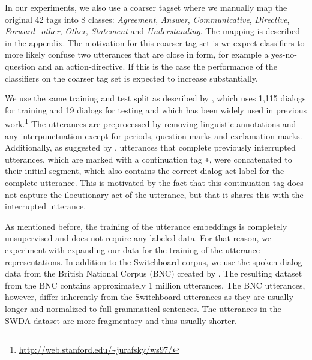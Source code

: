In our experiments, we also use a coarser tagset where we manually map the original 42 tags into 8 classes: \emph{Agreement}, \emph{Answer}, \emph{Communicative}, \emph{Directive}, \emph{Forward\_other}, \emph{Other},  \emph{Statement} and \emph{Understanding}.
The mapping is described in the appendix.
The motivation for this coarser tag set is we expect classifiers to more likely confuse two utterances that are close in form, for example a yes-no-question and an action-directive.
If this is the case the performance of the classifiers on the coarser tag set is expected to increase substantially.

We use the same training and test split as described by , which uses 1,115 dialogs for training and 19 dialogs for testing and which has been widely used in previous work.\footnote{\url{http://web.stanford.edu/~jurafsky/ws97/}}
The utterances are preprocessed by removing linguistic annotations and any interpunctuation except for periods, question marks and exclamation marks.
Additionally, as suggested by , utterances that complete previously interrupted utterances, which are marked with a continuation tag \texttt{+}, were concatenated to their initial segment, which also contains the correct dialog act label for the complete utterance. This is motivated by the fact that this continuation tag does not capture the ilocutionary act of the utterance, but that it shares this with the interrupted utterance.

As mentioned before, the training of the utterance embeddings is completely unsupervised and does not require any labeled data.
For that reason, we experiment with expanding our data for the training of the utterance representations.
In addition to the Switchboard corpus, we use the spoken dialog data from the British National Corpus (BNC) created by .
The resulting dataset from the BNC contains approximately 1 million utterances. 
The BNC utterances, however, differ inherently from the Switchboard utterances as they are usually longer and normalized to full grammatical sentences.
The utterances in the SWDA dataset are more fragmentary and thus usually shorter.



